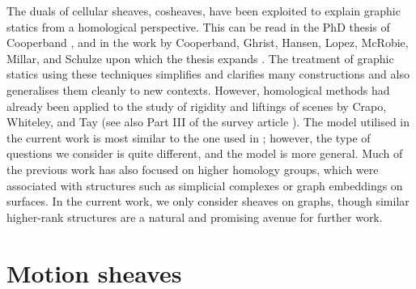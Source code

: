 \documentclass{article}
\theoremstyle{definition}
\theoremstyle{remark}
\begin{document}
The duals of cellular sheaves, cosheaves, have been exploited to explain graphic statics from a homological perspective. This can be read in the PhD thesis of Cooperband \cite{cooperband2024cellular}, and in the work by Cooperband, Ghrist, Hansen, Lopez, McRobie, Millar, and Schulze upon which the thesis expands \cite{cooperband2023towards, cooperband2024cellular,cooperband2024equivariant,cooperband2024homology,cooperband2025unified}. The treatment of graphic statics using these techniques simplifies and clarifies many constructions and also generalises them cleanly to new contexts. However, homological methods had already been applied to the study of rigidity and liftings of scenes by Crapo, Whiteley, and Tay \cite{Crapo-projective-configurations, crapo-geometric-homology, Whiteley1998-geometric-homology, Crapo2004StressesI3, TAY2000102} (see also Part III of the survey article \cite[part III]{Whiteley1996}). The model utilised in the current work is most similar to the one used in \cite{cooperband2025unified}; however, the type of questions we consider is quite different, and the model is more general. Much of the previous work has also focused on higher homology groups, which were associated with structures such as simplicial complexes or graph embeddings on surfaces. In the current work, we only consider sheaves on graphs, though similar higher-rank structures are a natural and promising avenue for further work.


\section{Motion sheaves}\label{sec: motion sheaves}
\end{document}
